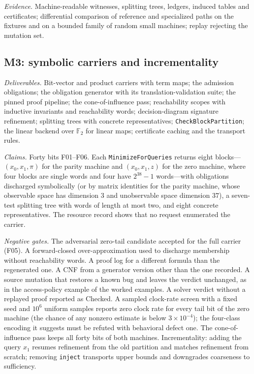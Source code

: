 \documentclass[11pt]{article}
\newcommand{\code}[1]{\texttt{#1}}
\newcommand{\F}{\mathbb{F}}
\begin{document}
\emph{Evidence.} Machine-readable witnesses, splitting trees, ledgers, induced tables and certificates;
differential comparison of reference and specialized paths on the fixtures and on a bounded family of
random small machines; replay rejecting the mutation set.

\subsection{M3: symbolic carriers and incrementality}

\emph{Deliverables.} Bit-vector and product carriers with term maps; the admission obligations; the
obligation generator with its translation-validation suite; the pinned proof pipeline; the
cone-of-influence pass; reachability scopes with inductive invariants and reachability words;
decision-diagram signature refinement; splitting trees with concrete representatives;
\code{CheckBlockPartition}; the linear backend over $\F_2$ for linear maps; certificate caching and the
transport rules.

\emph{Claims.} Forty bits F01--F06. Each \code{MinimizeForQueries} returns eight blocks---$(x_0,x_1,\pi)$
for the parity machine and $(x_0,x_1,z)$ for the zero machine, where four blocks are single words and
four have $2^{38}-1$ words---with obligations discharged symbolically (or by matrix identities for the
parity machine, whose observable space has dimension $3$ and unobservable space dimension $37$), a
seven-test splitting tree with words of length at most two, and eight concrete representatives. The
resource record shows that no request enumerated the carrier.

\emph{Negative gates.} The adversarial zero-tail candidate accepted for the full carrier (F05). A
forward-closed over-approximation used to discharge membership without reachability words. A proof
log for a different formula than the regenerated one. A CNF from a generator version other than the
one recorded. A source mutation that restores a known bug and leaves the verdict unchanged, as in the
access-policy example of the worked examples. A solver verdict without a replayed proof reported as
Checked. A sampled clock-rate screen with a fixed seed and $10^6$ uniform samples reports zero
clock rate for every tail bit of the zero machine (the chance of any nonzero estimate is below
$3\times10^{-4}$); the four-class encoding it suggests must be refuted with behavioral defect one. The
cone-of-influence pass keeps all forty bits of both machines. Incrementality: adding the query $x_1$
resumes refinement from the old partition and matches refinement from scratch; removing
\code{inject} transports upper bounds and downgrades coarseness to sufficiency.
\end{document}
